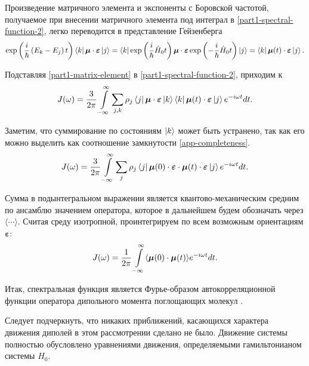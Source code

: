 Произведение матричного элемента и экспоненты с Боровской частотой, получаемое при внесении матричного элемента под интеграл в \eqref{part1-spectral-function-2}, легко переводится в представление Гейзенберга
\begin{gather}
    \exp \left( \frac{i}{\hbar} \left( E_k - E_j \right) t \right) \bra{k} \boldsymbol{\mu} \cdot \boldsymbol{\varepsilon} \ket{j} = \bra{k} \exp \left( \frac{i}{\hbar} \hat{H}_0 t \right) \boldsymbol{\mu} \cdot \boldsymbol{\varepsilon} \exp \left( -\frac{i}{\hbar} \hat{H}_0 t \right) \ket{j} = \bra{k} \boldsymbol{\mu}(t) \cdot \boldsymbol{\varepsilon} \ket{j}. \label{part1-matrix-element}
\end{gather}

Подставляя \eqref{part1-matrix-element} в \eqref{part1-spectral-function-2}, приходим к
\begin{gather}
    J(\omega) = \frac{3}{2\pi} \int\limits_{-\infty}^\infty \sum_{j,k} \rho_j \bra{j} \boldsymbol{\mu} \cdot \boldsymbol{\varepsilon} \ket{k} \bra{k} \boldsymbol{\mu}(t) \cdot \boldsymbol{\varepsilon} \ket{j} e^{-i \omega t} dt.
\end{gather}

Заметим, что суммирование по состояниям $\ket{k}$ может быть устранено, так как его можно выделить как соотношение замкнутости \eqref{app-completeness}. 
\begin{gather}
    J(\omega) = \frac{3}{2\pi} \int\limits_{-\infty}^\infty \sum_j  \rho_{j} \bra{j} \boldsymbol{\mu}(0) \cdot \boldsymbol{\varepsilon} \cdot \boldsymbol{\mu}(t) \cdot \boldsymbol{\varepsilon} \ket{j} e^{-i\omega t} dt.
\end{gather}

Сумма в подынтегральном выражении является квантово-механическим средним по ансамблю значением оператора, которое в дальнейшем будем обозначать через $\langle \cdots \rangle$. Считая среду изотропной, проинтегрируем по всем возможным ориентациям $\boldsymbol{\varepsilon}$:
\begin{gather}
    J(\omega) = \frac{1}{2\pi} \int\limits_{-\infty}^\infty \langle  \boldsymbol{\mu}(0) \cdot \boldsymbol{\mu}(t)  \rangle e^{-i \omega t} dt.
\end{gather}

Итак, спектральная функция является Фурье-образом автокорреляционной функции оператора дипольного момента поглощающих молекул \cite{gordon1968}. \par
Следует подчеркнуть, что никаких приближений, касающихся характера движения диполей в этом рассмотрении сделано не было. Движение системы полностью обусловлено уравнениями движения, определяемыми гамильтонианом системы $\hat{H}_0$. 


